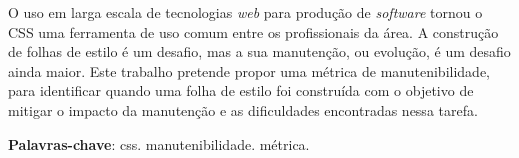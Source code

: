 %
%

\begin{resumo}

O uso em larga escala de tecnologias \textit{web} para produção de \textit{software} tornou o CSS uma ferramenta de uso comum entre os profissionais da área.
A construção de folhas de estilo é um desafio, mas a sua manutenção, ou evolução, é um desafio ainda maior. Este trabalho pretende propor uma métrica de manutenibilidade, para identificar quando uma folha de estilo foi construída com o objetivo de mitigar o impacto da manutenção e as dificuldades encontradas nessa tarefa.

\textbf{Palavras-chave}: css. manutenibilidade. métrica.

\end{resumo}
